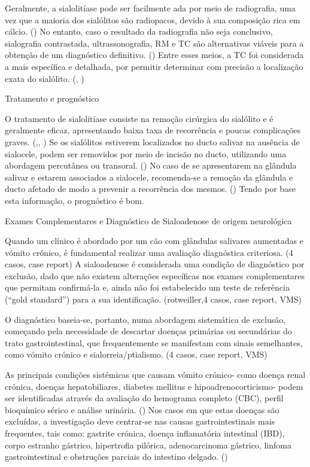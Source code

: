 Geralmente, a sialolitíase pode ser facilmente \cite{Kumar2017}ada por meio de radiografia, uma vez que a maioria dos sialólitos são radiopacos, devido à sua composição rica em cálcio. (\cite{Han2016}) No entanto, caso o resultado da radiografia não seja conclusivo, sialografia contrastada, ultrassonografia, RM e TC são alternativas viáveis para a obtenção de um diagnóstico definitivo. (\cite{Han2016}) Entre esses meios, a TC foi considerada a mais específica e detalhada, por permitir determinar com precisão a localização exata do sialólito. (\cite{Han2016}, \cite{cvj})


Tratamento e prognóstico


O tratamento de sialolitíase consiste na remoção cirúrgica do sialólito e é geralmente eficaz, apresentando baixa taxa de recorrência e poucas complicações graves. (\cite{Han2016},\cite{Ryan2008}, \cite{cvj}) Se os sialólitos estiverem localizados no ducto salivar na ausência de sialocele, podem ser removidos por meio de incisão no ducto, utilizando uma abordagem percutânea ou transoral. (\cite{Han2016}) 
No caso de se apresentarem na glândula salivar e estarem associados a sialocele, recomenda-se a remoção da glândula e ducto afetado de modo a prevenir a recorrência dos mesmos. (\cite{Han2016})
Tendo por base esta informação, o prognóstico é bom.


Exames Complementares e Diagnóstico de Sialoadenose de origem neurológica

Quando um clínico é abordado por um cão com glândulas salivares aumentadas e vómito crónico, é fundamental realizar uma avaliação diagnóstica criteriosa. (4 casos, case report) 
A sialoadenose é considerada uma condição de diagnóstico por exclusão, dado que não existem alterações específicas nos exames complementares que permitam confirmá-la e, ainda não foi estabelecido um teste de referência (“gold standard”) para a sua identificação. (rotweiller,4 casos, case report, VMS) 


O diagnóstico baseia-se, portanto, numa abordagem sistemática de exclusão, começando pela necessidade de descartar doenças primárias ou secundárias do trato gastrointestinal, que frequentemente se manifestam com sinais semelhantes, como vómito crónico e sialorreia/ptialismo. (4 casos, case report, VMS)


As principais condições sistémicas que causam vómito crónico- como doença renal crónica, doenças hepatobiliares, diabetes mellitus e hipoadrenocorticismo- podem ser identificadas através da avaliação do hemograma completo (CBC), perfil bioquímico sérico e análise urinária. (\cite{Leib2010}) Nos casos em que estas doenças são excluídas, a investigação deve centrar-se nas causas gastrointestinais mais frequentes, tais como: gastrite crónica, doença inflamatória intestinal (IBD), corpo estranho gástrico, hipertrofia pilórica, adenocarcinoma gástrico, linfoma gastrointestinal e obstruções parciais do intestino delgado. (\cite{Leib2010})


